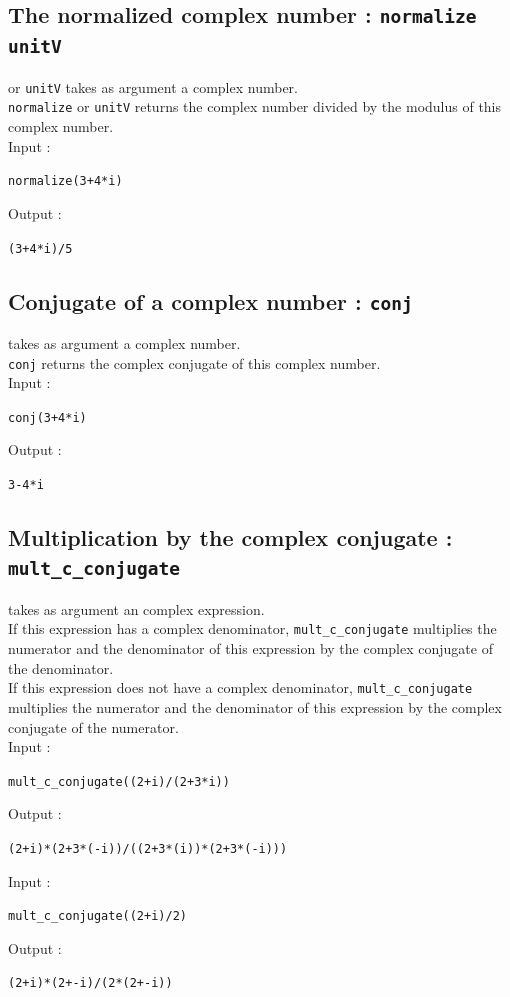 \documentclass[a4paper,11pt]{book}
\begin{document}
\subsection{The normalized complex number : {\tt normalize unitV}}
 or {\tt unitV} takes as argument a complex number.\\
{\tt normalize} or {\tt unitV} returns the complex number divided by the
modulus of this complex number.\\
Input :
\begin{center}{\tt normalize(3+4*i)}\end{center}
Output :
\begin{center}{\tt (3+4*i)/5}\end{center}

\subsection{Conjugate of a complex number : {\tt conj}}
 takes as argument a complex number.\\
{\tt conj} returns the complex conjugate of this complex number.\\
Input :
\begin{center}{\tt conj(3+4*i)}\end{center}
Output :
\begin{center}{\tt 3-4*i}\end{center}

\subsection{Multiplication by the complex conjugate  :\\
 {\tt mult\_c\_conjugate}}
 takes as argument an complex expression.\\ 
If this expression has a complex denominator,
{\tt mult\_c\_conjugate} multiplies the numerator and the denominator of this 
 expression by the complex conjugate of the denominator.\\
If this  expression does not have a complex denominator,
{\tt mult\_c\_conjugate} multiplies the numerator and the denominator of this 
expression by the complex conjugate of the numerator.\\
Input :
\begin{center}{\tt mult\_c\_conjugate((2+i)/(2+3*i))}\end{center}
Output :
\begin{center}{\tt (2+i)*(2+3*(-i))/((2+3*(i))*(2+3*(-i)))}\end{center}
Input :
\begin{center}{\tt mult\_c\_conjugate((2+i)/2)}\end{center}
Output :
\begin{center}{\tt (2+i)*(2+-i)/(2*(2+-i))}\end{center}
\end{document}
